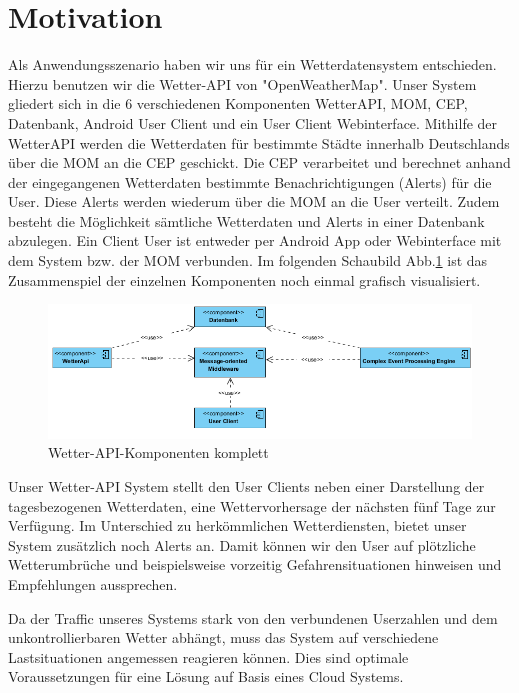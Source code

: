 \section{Motivation}

Als Anwendungsszenario haben wir uns für ein Wetterdatensystem entschieden. Hierzu benutzen wir die Wetter-API von "OpenWeatherMap". Unser System gliedert sich in die 6 verschiedenen Komponenten WetterAPI, MOM, CEP, Datenbank, Android  User Client und ein User Client Webinterface. Mithilfe der WetterAPI werden die Wetterdaten für bestimmte Städte innerhalb Deutschlands über die MOM an die CEP geschickt. Die CEP verarbeitet und berechnet anhand der eingegangenen Wetterdaten bestimmte Benachrichtigungen (Alerts) für die User. Diese Alerts werden wiederum über die MOM an die User verteilt.  Zudem besteht die Möglichkeit sämtliche Wetterdaten und Alerts in einer Datenbank abzulegen. Ein Client User ist entweder per Android App oder Webinterface mit dem System bzw. der MOM verbunden.
Im folgenden Schaubild Abb.\ref{img:KomponentenKomplett} ist das Zusammenspiel der einzelnen Komponenten noch einmal grafisch visualisiert.

\begin{figure}[!ht]
	\centering
	\includegraphics[width=1.0\textwidth]{Bilder/alleKomponenten.PNG}
	\caption{Wetter-API-Komponenten komplett}
	\label{img:KomponentenKomplett}
\end{figure}

Unser Wetter-API System stellt den User Clients neben einer Darstellung der tagesbezogenen Wetterdaten, eine Wettervorhersage der nächsten fünf Tage zur Verfügung. Im Unterschied zu herkömmlichen Wetterdiensten, bietet unser System zusätzlich noch Alerts an. Damit  können wir den User auf plötzliche Wetterumbrüche und beispielsweise vorzeitig Gefahrensituationen hinweisen und Empfehlungen aussprechen. 

Da der Traffic unseres Systems stark von den verbundenen Userzahlen und dem unkontrollierbaren Wetter abhängt, muss  das System auf verschiedene Lastsituationen angemessen reagieren können. Dies sind optimale Voraussetzungen für eine Lösung auf Basis eines Cloud Systems.


